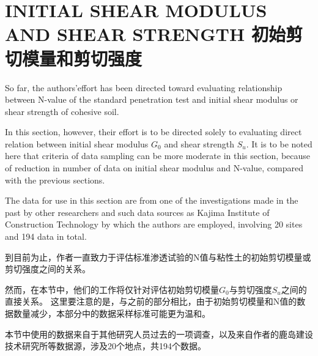 \section*{INITIAL SHEAR MODULUS AND SHEAR STRENGTH 初始剪切模量和剪切强度}

\begin{paracol}{2}
    
    So far, the authors'effort has been directed toward evaluating relationship between N-value of the standard penetration test and initial shear modulus or shear strength of cohesive soil.
    
    In this section, however, their effort is to be directed solely to evaluating direct relation between initial shear modulus $G_0$ and shear strength $S_u$. It is to be noted here that criteria of data sampling can be more moderate in this section, because of reduction in number of data on initial shear modulus and N-value, compared with the previous sections.
    
    The data for use in this section are from one of the investigations made in the past by other researchers\citet{Shima19681301, Shima1969819} and such data sources as Kajima Institute of Construction Technology by which the authors are employed, involving 20 sites and 194 data in total.

    \switchcolumn

    到目前为止，作者一直致力于评估标准渗透试验的N值与粘性土的初始剪切模量或剪切强度之间的关系。
            
    然而，在本节中，他们的工作将仅针对评估初始剪切模量$G_0$与剪切强度$S_u$之间的直接关系。 这里要注意的是，与之前的部分相比，由于初始剪切模量和N值的数据数量减少，本部分中的数据采样标准可能更为温和。
            
    本节中使用的数据来自于其他研究人员\citet{Shima19681301, Shima1969819}过去的一项调查，以及来自作者的鹿岛建设技术研究所等数据源，涉及20个地点，共194个数据。
    
\end{paracol}


